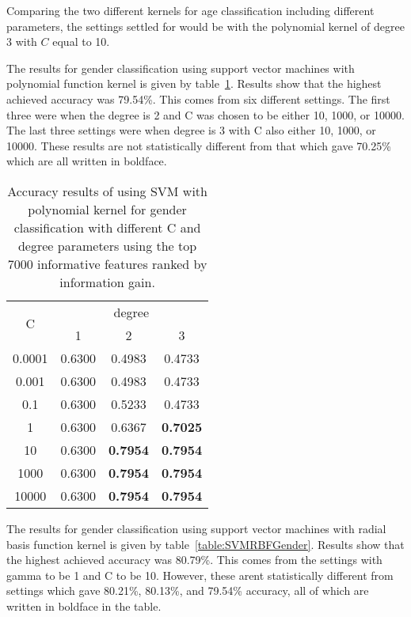 \documentclass[a4paper]{llncs}
\begin{document}
Comparing the two different kernels for age classification including different parameters, the settings settled for would be with the polynomial kernel of degree 3 with $C$ equal to 10.  
 
The results for gender classification using support vector machines with polynomial function kernel is given by table~\ref{table:SVMPolyGender}. Results show  that the highest achieved accuracy was 79.54\%. This comes from six different settings. The first three were when the degree is 2 and C was chosen to be either 10, 1000, or 10000. The last three settings were when degree is 3 with C also either 10, 1000, or 10000. These results are not statistically different from that which gave 70.25\% which are all written in boldface. 


\begin{table}[!htbp]
\centering
\begin{tabular}{|c|c|c|c|}
\hline
\multirow{2}{*}{C} & \multicolumn{3}{c|}{degree}                \\ \cline{2-4} 
                   & 1      & 2               & 3               \\ \hline
0.0001             & 0.6300 & 0.4983          & 0.4733          \\ \hline
0.001              & 0.6300 & 0.4983          & 0.4733          \\ \hline
0.1                & 0.6300 & 0.5233          & 0.4733          \\ \hline
1                  & 0.6300 & 0.6367          & \textbf{0.7025} \\ \hline
10                 & 0.6300 & \textbf{0.7954} & \textbf{0.7954} \\ \hline
1000               & 0.6300 & \textbf{0.7954} & \textbf{0.7954} \\ \hline
10000              & 0.6300 & \textbf{0.7954} & \textbf{0.7954} \\ \hline
\end{tabular}
\caption{Accuracy results of using SVM with polynomial kernel for gender classification with different C and degree parameters using the top 7000 informative features ranked by information gain.}
\label{table:SVMPolyGender}
\end{table}


The results for gender classification using support vector machines with radial basis function kernel is given by table~\ref{table:SVMRBFGender}. Results show  that the highest achieved accuracy was 80.79\%. This comes from the settings with gamma to be 1 and C to be 10. However, these arent statistically different from settings which gave 80.21\%, 80.13\%, and 79.54\% accuracy, all of which are written in boldface in the table.
\end{document}
